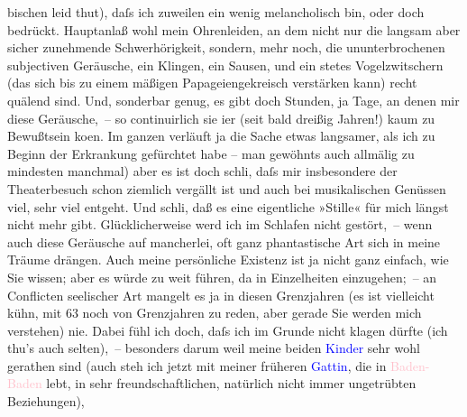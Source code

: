                bischen leid thut), daſs ich {\pb}zuweilen ein wenig
               melancholisch bin, oder doch bedrückt. Hauptanlaß wohl mein Ohrenleiden, an dem nicht
               nur die langsam aber sicher zunehmende Schwerhörigkeit, sondern, mehr noch, die
               ununterbrochenen subjectiven Geräusche, ein Klingen, ein Sausen, und ein \strikeout{\textcolor{gray}{nicht}} stetes Vogelzwitschern (das sich bis zu einem mäßigen Papageiengekreisch
               verstärken kann) recht quälend sind. Und, sonderbar genug, es gibt doch Stunden, ja
               Tage, an denen mir diese Geräusche, – so continuirlich sie i{\geminationm}er (seit bald dreißig Jahren!) kaum zu Bewußtsein ko{\geminationm}en. Im ganzen verläuft ja die Sache etwas langsamer,
               als ich zu Beginn der Erkrankung gefürchtet habe – man gewöhnts auch allmälig \label{T_L02444_1v}\label{T_L02444_1h}zu mindesten manchmal) aber es ist doch schli{\geminationm}, daſs mir insbesondere der Theaterbesuch schon
               ziemlich vergällt ist und auch bei musikalischen Genüssen viel, sehr viel entgeht.
               Und schli{\geminationm}, {\pb}daß es
               eine eigentliche »Stille« für mich längst nicht mehr gibt. Glücklicherweise werd ich
               im Schlafen nicht gestört, – wenn auch diese Geräusche auf mancherlei, oft ganz
               phantastische Art sich in meine Träume drängen.\pend
           \pstart
           Auch meine persönliche Existenz ist ja nicht ganz einfach, wie Sie wissen; aber es
               würde zu weit führen, da in Einzelheiten einzugehen; – an Conflicten seelischer Art
               mangelt es ja in diesen Grenzjahren (es ist vielleicht kühn, mit 63 noch von
               Grenzjahren zu reden, aber gerade Sie werden mich verstehen) nie.\pend
           \pstart
           Dabei fühl ich doch, daſs ich im Grunde nicht klagen dürfte (ich thu’s auch
               selten), – besonders darum weil meine beiden \textcolor{blue}{Kinder}{} sehr wohl gerathen sind (auch steh ich jetzt mit
               meiner früheren \textcolor{blue}{Gattin}{}, die in
                  \textcolor{pink}{Baden-Baden}{}\ledrightnote{\textcolor{pink}{Baden-Baden}} lebt, in sehr freundschaftlichen,
               natürlich nicht immer unge{\pb}trübten Beziehungen),
